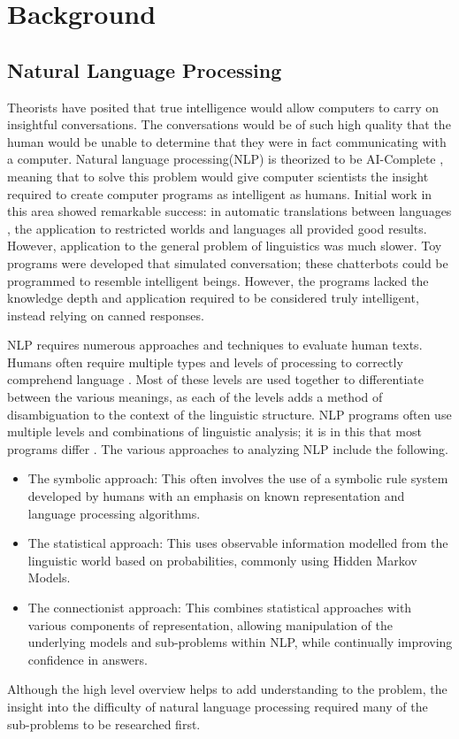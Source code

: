 \chapter{Background} 

\section{Natural Language Processing}

Theorists have posited that true intelligence would allow computers to carry 
on insightful conversations. The conversations would be of
such high quality that the human would be unable to determine that they were in
fact communicating with a computer\cite{TURING_TEST}.  Natural language
processing(NLP) is theorized to be AI-Complete \cite{AICOMPLETE}, meaning that
to solve this problem would give computer scientists the insight required to
create computer programs as intelligent as humans.  Initial work in this area
showed remarkable success: in automatic translations between languages
\cite{EN_RUS}, the application to restricted worlds and
languages\cite{AI_MODERN} all provided good results.  However, application to
the general problem of linguistics was much slower.  Toy programs were developed
that simulated conversation; these chatterbots could be programmed to resemble
intelligent beings.  However, the programs lacked the knowledge depth and
application required to be considered truly intelligent, instead relying on
canned responses.   

NLP requires numerous approaches and techniques to
evaluate human texts. Humans often require multiple types and levels of
processing to correctly comprehend language \cite{NLPENCY}. Most of these levels
are used together to differentiate between the various meanings, as each of the
levels adds a method of disambiguation to the context of the linguistic
structure.  NLP programs often use multiple levels and combinations of
linguistic analysis; it is in this that most programs differ \cite{NLPENCY}.
The various approaches to analyzing NLP include the following. \begin{itemize}
\item The symbolic approach: This often involves the use of a symbolic rule
system developed by humans with an emphasis on known representation and language
processing algorithms.     \item The statistical approach: This uses observable
information modelled from the linguistic world based on probabilities, commonly
using Hidden Markov Models.     \item The connectionist approach: This combines
statistical approaches with various components of representation, allowing
manipulation of the underlying models and sub-problems within NLP, while
continually improving confidence in answers. \end{itemize} Although the high
level overview helps to add understanding to the problem, the insight into the
difficulty of natural language processing required many of the sub-problems to
be researched first.

